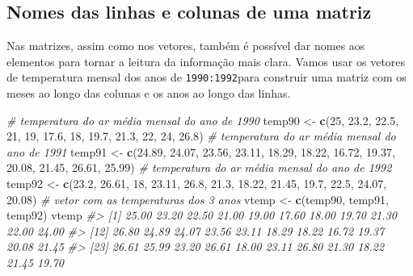 \documentclass[]{book}
\newenvironment{Shaded}{\begin{snugshade}}{\end{snugshade}}
\newcommand{\KeywordTok}[1]{\textcolor[rgb]{0.13,0.29,0.53}{\textbf{#1}}}
\newcommand{\DecValTok}[1]{\textcolor[rgb]{0.00,0.00,0.81}{#1}}
\newcommand{\FloatTok}[1]{\textcolor[rgb]{0.00,0.00,0.81}{#1}}
\newcommand{\StringTok}[1]{\textcolor[rgb]{0.31,0.60,0.02}{#1}}
\newcommand{\CommentTok}[1]{\textcolor[rgb]{0.56,0.35,0.01}{\textit{#1}}}
\newcommand{\NormalTok}[1]{#1}
\begin{document}
\subsection{Nomes das linhas e colunas de uma
matriz}\label{nomes-das-linhas-e-colunas-de-uma-matriz}

Nas matrizes, assim como nos vetores, também é possível dar nomes aos
elementos para tornar a leitura da informação mais clara. Vamos usar os
vetores de temperatura mensal dos anos de \texttt{1990:1992}para
construir uma matriz com os meses ao longo das colunas e os anos ao
longo das linhas.

\begin{Shaded}
\begin{Highlighting}[]
\CommentTok{# temperatura do ar média mensal do ano de 1990}
\NormalTok{temp90 <-}\StringTok{ }\KeywordTok{c}\NormalTok{(}\DecValTok{25}\NormalTok{, }\FloatTok{23.2}\NormalTok{, }\FloatTok{22.5}\NormalTok{, }\DecValTok{21}\NormalTok{, }\DecValTok{19}\NormalTok{, }\FloatTok{17.6}\NormalTok{, }\DecValTok{18}\NormalTok{, }\FloatTok{19.7}\NormalTok{, }\FloatTok{21.3}\NormalTok{, }\DecValTok{22}\NormalTok{, }\DecValTok{24}\NormalTok{, }\FloatTok{26.8}\NormalTok{)}
\CommentTok{# temperatura do ar média mensal do ano de 1991}
\NormalTok{temp91 <-}\StringTok{ }\KeywordTok{c}\NormalTok{(}\FloatTok{24.89}\NormalTok{, }\FloatTok{24.07}\NormalTok{, }\FloatTok{23.56}\NormalTok{, }\FloatTok{23.11}\NormalTok{, }\FloatTok{18.29}\NormalTok{, }\FloatTok{18.22}\NormalTok{, }\FloatTok{16.72}\NormalTok{, }\FloatTok{19.37}\NormalTok{, }\FloatTok{20.08}\NormalTok{, }\FloatTok{21.45}\NormalTok{, }
    \FloatTok{26.61}\NormalTok{, }\FloatTok{25.99}\NormalTok{)}
\CommentTok{# temperatura do ar média mensal do ano de 1992}
\NormalTok{temp92 <-}\StringTok{ }\KeywordTok{c}\NormalTok{(}\FloatTok{23.2}\NormalTok{, }\FloatTok{26.61}\NormalTok{, }\DecValTok{18}\NormalTok{, }\FloatTok{23.11}\NormalTok{, }\FloatTok{26.8}\NormalTok{, }\FloatTok{21.3}\NormalTok{, }\FloatTok{18.22}\NormalTok{, }\FloatTok{21.45}\NormalTok{, }\FloatTok{19.7}\NormalTok{, }\FloatTok{22.5}\NormalTok{, }\FloatTok{24.07}\NormalTok{, }
    \FloatTok{20.08}\NormalTok{)}
\CommentTok{# vetor com as temperaturas dos 3 anos}
\NormalTok{vtemp <-}\StringTok{ }\KeywordTok{c}\NormalTok{(temp90, temp91, temp92)}
\NormalTok{vtemp}
\CommentTok{#>  [1] 25.00 23.20 22.50 21.00 19.00 17.60 18.00 19.70 21.30 22.00 24.00}
\CommentTok{#> [12] 26.80 24.89 24.07 23.56 23.11 18.29 18.22 16.72 19.37 20.08 21.45}
\CommentTok{#> [23] 26.61 25.99 23.20 26.61 18.00 23.11 26.80 21.30 18.22 21.45 19.70}

\end{Highlighting}
\end{Shaded}
\end{document}
